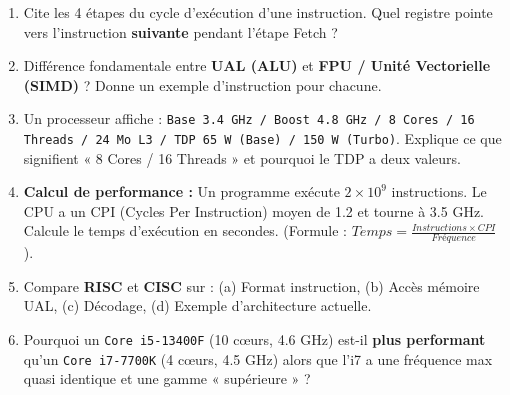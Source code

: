 \documentclass[11pt]{article}
\begin{document}
\begin{exercice}
\begin{enumerate}
    \item Cite les 4 étapes du cycle d'exécution d'une instruction. Quel registre pointe vers l'instruction \textbf{suivante} pendant l'étape Fetch ?
    \item Différence fondamentale entre \textbf{UAL (ALU)} et \textbf{FPU / Unité Vectorielle (SIMD)} ? Donne un exemple d'instruction pour chacune.
    \item Un processeur affiche : \texttt{Base 3.4 GHz / Boost 4.8 GHz / 8 Cores / 16 Threads / 24 Mo L3 / TDP 65 W (Base) / 150 W (Turbo)}. Explique ce que signifient « 8 Cores / 16 Threads » et pourquoi le TDP a deux valeurs.
    \item \textbf{Calcul de performance :} Un programme exécute $2 \times 10^9$ instructions. Le CPU a un CPI (Cycles Per Instruction) moyen de 1.2 et tourne à 3.5 GHz. Calcule le temps d'exécution en secondes. (Formule : $Temps = \frac{Instructions \times CPI}{Fréquence}$).
    \item Compare \textbf{RISC} et \textbf{CISC} sur : (a) Format instruction, (b) Accès mémoire UAL, (c) Décodage, (d) Exemple d'architecture actuelle.
    \item Pourquoi un \texttt{Core i5-13400F} (10 cœurs, 4.6 GHz) est-il \textbf{plus performant} qu'un \texttt{Core i7-7700K} (4 cœurs, 4.5 GHz) alors que l'i7 a une fréquence max quasi identique et une gamme « supérieure » ?
\end{enumerate}
\end{exercice}
\end{document}

